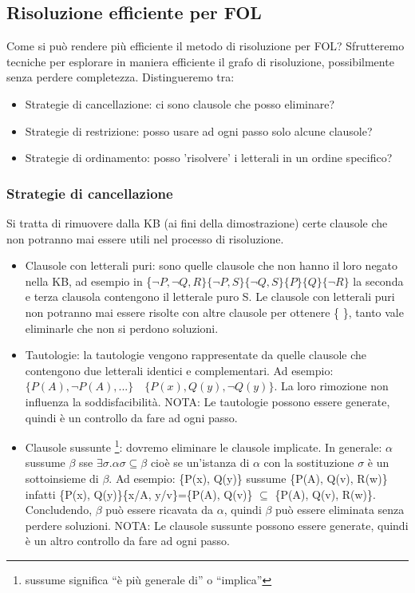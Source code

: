 \documentclass{article}
\begin{document}
\subsection{Risoluzione efficiente per FOL}
Come si può rendere più efficiente il metodo di risoluzione per FOL? Sfrutteremo tecniche per esplorare in maniera efficiente il grafo di risoluzione, possibilmente senza perdere completezza. Distingueremo tra:
\begin{itemize}
    \item Strategie di cancellazione: ci sono clausole che posso eliminare?
    \item Strategie di restrizione: posso usare ad ogni passo solo alcune clausole?
    \item Strategie di ordinamento: posso 'risolvere' i letterali in un ordine specifico?
\end{itemize}
\subsubsection{Strategie di cancellazione}
Si tratta di rimuovere dalla KB (ai fini della dimostrazione) certe clausole che non potranno mai essere utili nel processo di risoluzione.
\begin{itemize}
    \item Clausole con letterali puri: sono quelle clausole che non hanno il loro negato nella KB, ad esempio in \{$\neg P, \neg Q, R\}  \{\neg P, S\}  \{\neg Q, S\} \{P\} \{Q\} \{\neg R\}$  la seconda e terza clausola contengono il letterale puro S. Le clausole con letterali puri non potranno mai essere risolte con altre clausole per ottenere \{ \}, tanto vale eliminarle che non si perdono soluzioni.
    \item Tautologie: la tautologie vengono rappresentate da quelle clausole che contengono due letterali identici e complementari. Ad esempio: $\{P(A), \neg P(A), ...\} \quad \{P(x), Q(y), \neg Q(y)\}$. La loro rimozione non influenza la soddisfacibilità. \newline 
    NOTA: Le tautologie possono essere generate, quindi è un controllo da fare ad ogni passo.
    \item Clausole sussunte \footnote{sussume significa “è più generale di” o “implica”}: dovremo eliminare le clausole implicate. In generale: $\alpha$ sussume $\beta$ sse $\exists \sigma . \alpha \sigma \subseteq \beta$ cioè se un’istanza di $\alpha$ con la sostituzione $\sigma$ è un sottoinsieme di $\beta$. \newline
    Ad esempio: \{P(x), Q(y)\} sussume \{P(A), Q(v), R(w)\} infatti \{P(x), Q(y)\}\{x/A, y/v\}=\{P(A), Q(v)\} $\subseteq$ \{P(A), Q(v), R(w)\}. Concludendo, $\beta$ può essere ricavata da $\alpha$, quindi $\beta$ può essere eliminata senza perdere soluzioni. \newline 
    NOTA: Le clausole sussunte possono essere generate, quindi è un altro controllo da fare ad ogni passo.
\end{itemize}
\end{document}
